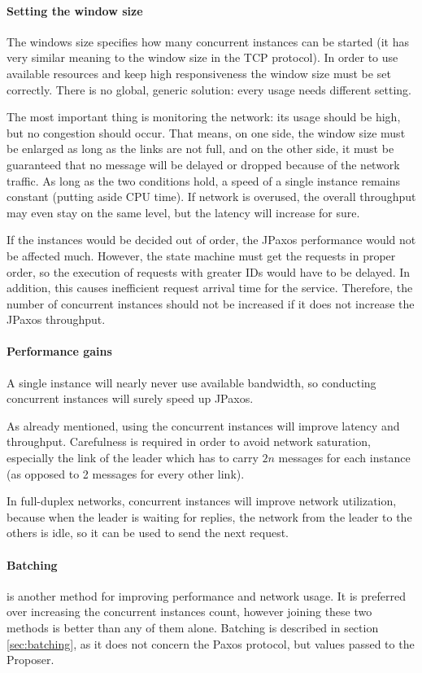 \paragraph{Setting the window size}
The windows size specifies how many concurrent instances can be started (it has very similar meaning to the window size in the TCP protocol). In order to use available resources and keep high responsiveness the window size must be set correctly. There is no global, generic solution: every usage needs different setting.

The most important thing is monitoring the network: its usage should be high, but no congestion should occur.
That means, on one side, the window size must be enlarged as long as the links are not full, and on the other side, it must be guaranteed that no message will be delayed or dropped because of the network traffic. As long as the two conditions hold, a speed of a single instance remains constant (putting aside CPU time).
If network is overused, the overall throughput may even stay on the same level, but the latency will increase for sure.

If the instances would be decided out of order, the JPaxos performance would not be affected much. However, the state machine must get the requests in proper order, so the execution of requests with greater IDs would have to be delayed. In addition, this causes inefficient request arrival time for the service. Therefore, the number of concurrent instances should not be increased if it does not increase the JPaxos throughput.

\paragraph{Performance gains}
A single instance will nearly never use available bandwidth, so conducting concurrent instances will surely speed up JPaxos.

As already mentioned, using the concurrent instances will improve latency and throughput. Carefulness is required in order to avoid network saturation, especially the link of the leader which has to carry $2n$ messages for each instance (as opposed to 2 messages for every other link).

In full-duplex networks, concurrent instances will improve network utilization, because when the leader is waiting for replies, the network from the leader to the others is idle, so it can be used to send the next request. 

\paragraph{Batching} is another method for improving performance and network usage. It is preferred over increasing the concurrent instances count, however joining these two methods is better than any of them alone. Batching is described in section \ref{sec:batching}, as it does not concern the Paxos protocol, but values passed to the Proposer.


